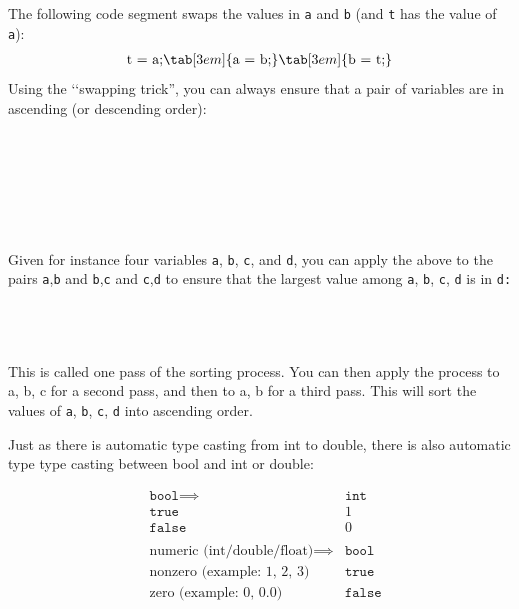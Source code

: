 The following code segment swaps the values in \texttt{a} and \texttt{b}
(and \texttt{t} has the value of \texttt{a}):
\begin{align*}
&\text{t = a;} \tab[3em]{\text{a = b;}} \tab[3em]{\text{b = t;}}\\
\end{align*}
Using the \lq\lq swapping trick'', you can always ensure that a pair of
variables are in ascending (or descending order):

\\
\tab[3em]{\{}\\
\\
\\
\\
\tab[3em]{\}}\\

Given for instance four variables \texttt{a}, \texttt{b}, \texttt{c}, and
\texttt{d}, you can apply the above to the pairs \texttt{a},\texttt{b} and
\texttt{b},\texttt{c} and \texttt{c},\texttt{d} to ensure that the largest value
among \texttt{a}, \texttt{b}, \texttt{c}, \texttt{d} is in \texttt{d:}

\\
\\
\\

This is called one pass of the sorting process. You can then apply the
process to a, b, c for a second pass, and then to a, b for a third pass.
This will sort the values of \texttt{a}, \texttt{b}, \texttt{c}, \texttt{d} into
ascending order.

Just as there is automatic type casting from int to double, there is
also automatic type type casting between bool and int or double:

\begin{align*}
&\texttt{bool} \implies &\texttt{int}\\
&\texttt{true} &1\\
&\texttt{false} &0\\\\
&\text{numeric (int/double/float)} \implies &\texttt{bool}\\
&\text{nonzero (example: 1, 2, 3)} &\texttt{true}\\
&\text{zero (example: 0, 0.0)} &\texttt{false}\\
\end{align*}


